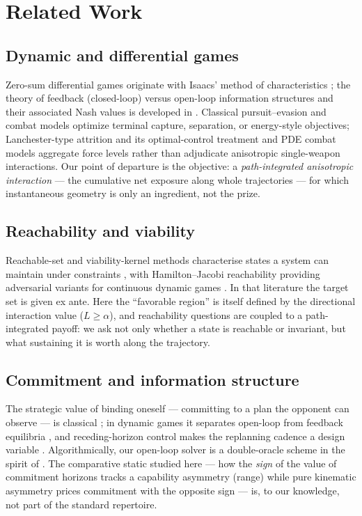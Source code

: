 \documentclass[12pt,a4paper]{article}
\begin{document}
\section{Related Work}\label{sec:related}

\subsection{Dynamic and differential games}
Zero-sum differential games originate with Isaacs' method of characteristics
\cite{isaacs1965}; the theory of feedback (closed-loop) versus open-loop
information structures and their associated Nash values is developed in
\cite{basar1999}.  Classical pursuit--evasion and combat models optimize
terminal capture, separation, or energy-style objectives; Lanchester-type
attrition and its optimal-control treatment \cite{taylor1974} and
PDE combat models \cite{protopopescu1989} aggregate force levels rather
than adjudicate anisotropic single-weapon interactions.  Our point of
departure is the objective: a \emph{path-integrated anisotropic
interaction} --- the cumulative net exposure along whole trajectories ---
for which instantaneous geometry is only an ingredient, not the prize.

\subsection{Reachability and viability}
Reachable-set and viability-kernel methods characterise states a system
can maintain under constraints \cite{aubin1991}, with Hamilton--Jacobi
reachability providing adversarial variants for continuous dynamic games
\cite{mitchell2005}.  In that literature the target set is given ex
ante.  Here the ``favorable region'' is itself defined by the directional
interaction value ($L\ge\alpha$), and reachability questions are coupled
to a path-integrated payoff: we ask not only whether a state is reachable
or invariant, but what sustaining it is worth along the trajectory.

\subsection{Commitment and information structure}
The strategic value of binding oneself --- committing to a plan the
opponent can observe --- is classical \cite{schelling1960}; in dynamic
games it separates open-loop from feedback equilibria \cite{basar1999},
and receding-horizon control makes the replanning cadence a design
variable \cite{mayne2000}.  Algorithmically, our open-loop solver is a
double-oracle scheme in the spirit of \cite{mcmahan2003}.  The
comparative static studied here --- how the \emph{sign} of the value of
commitment horizons tracks a capability asymmetry (range) while pure
kinematic asymmetry prices commitment with the opposite sign --- is, to
our knowledge, not part of the standard repertoire.
\end{document}
